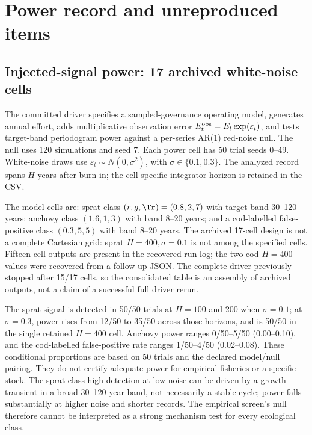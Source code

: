 \section{Power record and unreproduced items}\label{si:power-open}

\subsection{Injected-signal power: 17 archived white-noise cells}

The committed driver specifies a sampled-governance operating model, generates annual effort, adds multiplicative observation error \(E_t^{\rm obs}=E_t\exp(\varepsilon_t)\), and tests target-band periodogram power against a per-series AR(1) red-noise null. The null uses 120 simulations and seed 7. Each power cell has 50 trial seeds 0--49. White-noise draws use \(\varepsilon_t\sim N(0,\sigma^2)\), with \(\sigma\in\{0.1,0.3\}\). The analyzed record spans \(H\) years after burn-in; the cell-specific integrator horizon is retained in the CSV.

The model cells are: sprat class \((r,g,\Tr)=(0.8,2,7)\) with target band 30--120 years; anchovy class \((1.6,1,3)\) with band 8--20 years; and a cod-labelled false-positive class \((0.3,5,5)\) with band 8--20 years. The archived 17-cell design is not a complete Cartesian grid: sprat \(H=400,\sigma=0.1\) is not among the specified cells. Fifteen cell outputs are present in the recovered run log; the two cod \(H=400\) values were recovered from a follow-up JSON. The complete driver previously stopped after 15/17 cells, so the consolidated table is an assembly of archived outputs, not a claim of a successful full driver rerun.



The sprat signal is detected in 50/50 trials at \(H=100\) and 200 when \(\sigma=0.1\); at \(\sigma=0.3\), power rises from 12/50 to 35/50 across those horizons, and is 50/50 in the single retained \(H=400\) cell. Anchovy power ranges 0/50--5/50 (0.00--0.10), and the cod-labelled false-positive rate ranges 1/50--4/50 (0.02--0.08). These conditional proportions are based on 50 trials and the declared model/null pairing. They do not certify adequate power for empirical fisheries or a specific stock. The sprat-class high detection at low noise can be driven by a growth transient in a broad 30--120-year band, not necessarily a stable cycle; power falls substantially at higher noise and shorter records. The empirical screen's null therefore cannot be interpreted as a strong mechanism test for every ecological class.

